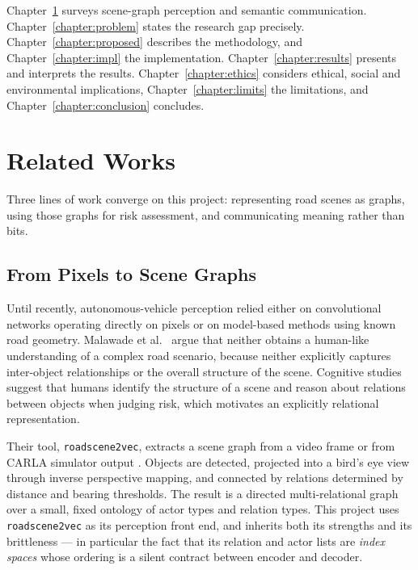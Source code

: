 \documentclass{iutbscthesis}
\begin{document}
Chapter~\ref{chapter:related} surveys scene-graph perception and semantic
communication. Chapter~\ref{chapter:problem} states the research gap precisely.
Chapter~\ref{chapter:proposed} describes the methodology, and
Chapter~\ref{chapter:impl} the implementation. Chapter~\ref{chapter:results}
presents and interprets the results. Chapter~\ref{chapter:ethics} considers
ethical, social and environmental implications,
Chapter~\ref{chapter:limits} the limitations, and
Chapter~\ref{chapter:conclusion} concludes.

\chapter{Related Works} \label{chapter:related}

Three lines of work converge on this project: representing road scenes as
graphs, using those graphs for risk assessment, and communicating meaning
rather than bits.

\section{From Pixels to Scene Graphs}

Until recently, autonomous-vehicle perception relied either on convolutional
networks operating directly on pixels or on model-based methods using known
road geometry. Malawade et al.\ \cite{malawade2022roadscene2vec} argue that
neither obtains a human-like understanding of a complex road scenario, because
neither explicitly captures inter-object relationships or the overall structure
of the scene. Cognitive studies suggest that humans identify the structure of a
scene and reason about relations between objects when judging risk, which
motivates an explicitly relational representation.

Their tool, \texttt{roadscene2vec}, extracts a scene graph from a video frame
or from CARLA simulator output \cite{dosovitskiy2017carla}. Objects are
detected, projected into a bird's eye view through inverse perspective mapping,
and connected by relations determined by distance and bearing thresholds. The
result is a directed multi-relational graph over a small, fixed ontology of
actor types and relation types. This project uses \texttt{roadscene2vec} as its
perception front end, and inherits both its strengths and its brittleness ---
in particular the fact that its relation and actor lists are \emph{index
spaces} whose ordering is a silent contract between encoder and decoder.
\end{document}
